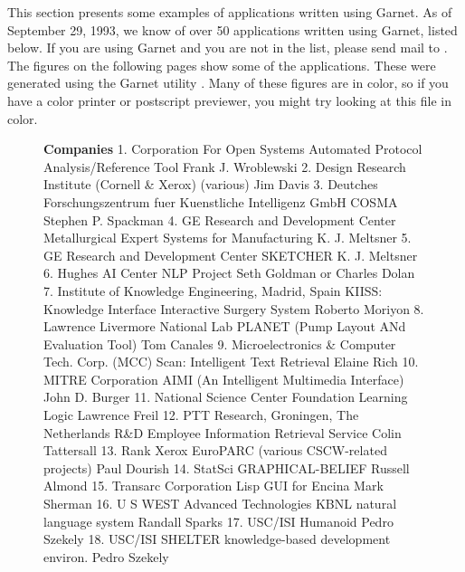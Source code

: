 This section presents some examples of applications written using
Garnet.  As of September 29, 1993, we know of over 50 applications
written using Garnet, listed below.  If you
are using Garnet and you are not in the list, please send mail to
.  The figures on the following pages show some
of the applications.  These were generated using the Garnet utility
.  Many of these figures are in color, so if you
have a color printer or postscript previewer, you might try looking at
this file in color.
\begin{figure}
\begin{figcol}
{\bf Companies}
1. Corporation For Open Systems
      Automated Protocol Analysis/Reference Tool
      Frank J. Wroblewski
2. Design Research Institute (Cornell \& Xerox)
      (various)
      Jim Davis
3. Deutches Forschungszentrum fuer Kuenstliche
          Intelligenz GmbH
      COSMA
      Stephen P. Spackman
4. GE Research and Development Center
      Metallurgical Expert Systems for Manufacturing
      K. J. Meltsner
5. GE Research and Development Center
      SKETCHER
      K. J. Meltsner
6. Hughes AI Center
      NLP Project
      Seth Goldman or Charles Dolan
7. Institute of Knowledge Engineering, Madrid, Spain
      KIISS: Knowledge Interface Interactive
          Surgery System
      Roberto Moriyon
8. Lawrence Livermore National Lab
      PLANET (Pump Layout ANd Evaluation Tool)
      Tom Canales
9. Microelectronics \& Computer Tech. Corp. (MCC)
      Scan: Intelligent Text Retrieval
      Elaine Rich
10. MITRE Corporation
      AIMI (An Intelligent Multimedia Interface)
      John D. Burger
11. National Science Center Foundation
      Learning Logic
      Lawrence Freil
12. PTT Research, Groningen, The Netherlands
      R\&D Employee Information Retrieval Service
      Colin Tattersall
13. Rank Xerox EuroPARC
      (various CSCW-related projects)
      Paul Dourish
14. StatSci
      GRAPHICAL-BELIEF
      Russell Almond
15. Transarc Corporation
      Lisp GUI for Encina
      Mark Sherman
16. U S WEST Advanced Technologies
      KBNL natural language system
      Randall Sparks
17. USC/ISI
      Humanoid
      Pedro Szekely
18. USC/ISI
      SHELTER knowledge-based development environ.
      Pedro Szekely


\end{figcol}
\end{figure}
